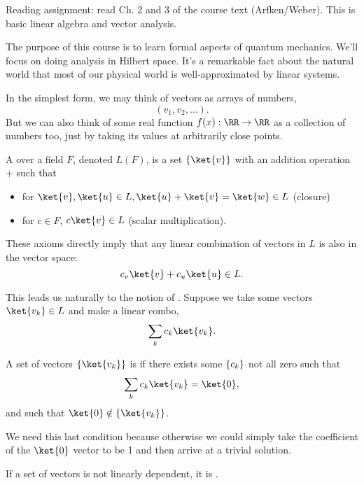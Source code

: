 Reading assignment: read Ch. 2 and 3 of the course text (Arfken/Weber). This is basic linear algebra and vector analysis.

The purpose of this course is to learn formal aspects of quantum mechanics. We'll focus on doing analysis in Hilbert space. It's a remarkable fact about the natural world that most of our physical world is well-approximated by linear systems.

In the simplest form, we may think of vectors as arrays of numbers,
\begin{equation}
    (v_1,v_2,\ldots).
\end{equation}
But we can also think of some real function $f(x):\RR\to \RR$ as a collection of numbers too, just by taking its values at arbitrarily close points.

\begin{defn}
    A  over a field $F$, denoted $L(F)$, is a set $\set{\ket{v}}$ with an addition operation $+$ such that
    \begin{itemize}
        \item for $\ket{v},\ket{u}\in L, \ket{u}+\ket{v}=\ket{w}\in L$ (closure)
        \item for $c\in F$, $c\ket{v}\in L$ (scalar multiplication).
    \end{itemize}
\end{defn}
These axioms directly imply that any linear combination of vectors in $L$ is also in the vector space:
\begin{equation}
    c_v \ket{v} +c_u \ket{u} \in L.
\end{equation}

This leads us naturally to the notion of . Suppose we take some vectors $\ket{v_k}\in L$ and make a linear combo,
\begin{equation}
    \sum_k c_k\ket{v_k}.
\end{equation}
\begin{defn}
    A set of vectors $\set{\ket{v_k}}$ is  if there exists some $\{c_k\}$ not all zero such that
    \begin{equation}
        \sum_k c_k\ket{v_k} =\ket{0},
    \end{equation}
    and such that $\ket{0}\notin \set{\ket{v_k}}$.
\end{defn}
We need this last condition because otherwise we could simply take the coefficient of the $\ket{0}$ vector to be 1 and then arrive at a trivial solution.
\begin{defn}
    If a set of vectors is not linearly dependent, it is .
\end{defn}

